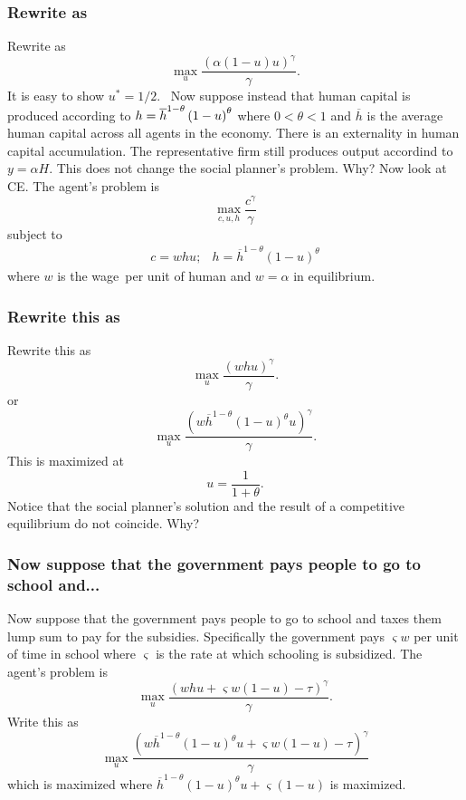 \documentclass[aspectratio=169]{ltx-talk}
\begin{document}
\begin{frame}
\frametitle{Rewrite as}
Rewrite as%
\begin{equation*}
\underset{u}{\max }\frac{\left( \alpha (1-u)u\right) ^{\gamma }}{\gamma }.
\end{equation*}%
It is easy to show $u^{\ast }=1/2$.\ \newline
Now suppose instead that human capital is produced according to $h=\overline{%
h}^{1-\theta }\left( 1-u\right) ^{\theta }$ where $0<\theta <1$ and $%
\overline{h}$ is the average human capital across all agents in the economy.
There is an externality in human capital accumulation. The representative
firm still produces output accordind to $y=\alpha H.$ This does not change
the social planner's problem. Why? Now look at CE. The agent's problem is%
\begin{equation*}
\underset{c,u,h}{\max }\frac{c^{\gamma }}{\gamma }
\end{equation*}%
subject to 
\begin{equation*}
\begin{array}{ll}
c=whu; & h=\overline{h}^{1-\theta }\left( 1-u\right) ^{\theta }%
\end{array}%
\end{equation*}%
where $w$ is the wage\ per unit of human and $w=\alpha $ in
equilibrium.
\end{frame}

\begin{frame}
\frametitle{Rewrite this as}
Rewrite this as%
\begin{equation*}
\underset{u}{\max }\frac{\left( whu\right) ^{\gamma }}{\gamma }.
\end{equation*}%
or%
\begin{equation*}
\underset{u}{\max }\frac{\left( w\overline{h}^{1-\theta }(1-u)^{\theta
}u\right) ^{\gamma }}{\gamma }.
\end{equation*}%
This is maximized at 
\begin{equation*}
u=\frac{1}{1+\theta }.
\end{equation*}%
Notice that the social planner's solution and the result of a competitive
equilibrium do not coincide. Why?
\end{frame}

\begin{frame}
\frametitle{Now suppose that the government pays people to go to school and...}
Now suppose that the government pays people to go to school and taxes them
lump sum to pay for the subsidies. Specifically the government pays $%
\varsigma w$ per unit of time in school where $\varsigma $ is the rate at
which schooling is subsidized$.$ The agent's problem is 
\begin{equation*}
\underset{u}{\max }\frac{\left( whu+\varsigma w(1-u)-\tau \right) ^{\gamma }%
}{\gamma }.
\end{equation*}%
Write this as%
\begin{equation*}
\underset{u}{\max }\frac{\left( w\overline{h}^{1-\theta }(1-u)^{\theta
}u+\varsigma w(1-u)-\tau \right) ^{\gamma }}{\gamma }
\end{equation*}%
which is maximized where $\overline{h}^{1-\theta }(1-u)^{\theta }u+\varsigma
(1-u)$ is maximized.
\end{frame}
\end{document}
